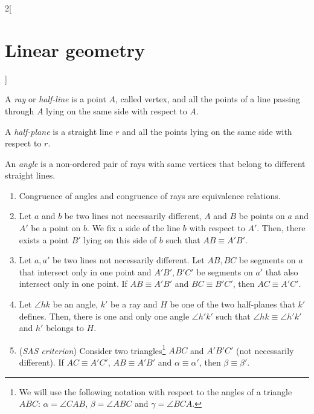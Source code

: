 \documentclass[../../../main_math.tex]{subfiles}
\begin{document}
\begin{multicols}{2}[\section{Linear geometry}]
\begin{axiom}
\begin{enumerate}
    \end{enumerate}
  \end{axiom}
  \begin{definition}
    A \emph{ray} or \emph{half-line} is a point $A$, called vertex, and all the points of a line passing through $A$ lying on the same side with respect to $A$.
  \end{definition}
  \begin{definition}
    A \emph{half-plane} is a straight line $r$ and all the points lying on the same side with respect to $r$.
  \end{definition}
  \begin{definition}
    An \emph{angle} is a non-ordered pair of rays with same vertices that belong to different straight lines.
  \end{definition}
  \begin{axiom}\label{LG_congruence}
    \hfill
    \begin{enumerate}
      \item Congruence of angles and congruence of rays are equivalence relations.
      \item Let $a$ and $b$ be two lines not necessarily different, $A$ and $B$ be points on $a$ and $A'$ be a point on $b$. We fix a side of the line $b$ with respect to $A'$. Then, there exists a point $B'$ lying on this side of $b$ such that $AB\equiv A'B'$.
      \item Let $a,a'$ be two lines not necessarily different. Let $AB,BC$ be segments on $a$ that intersect only in one point and $A'B',B'C'$ be segments on $a'$ that also intersect only in one point. If $AB\equiv A'B'$ and $BC\equiv B'C'$, then $AC\equiv A'C'$.
      \item Let $\angle hk$ be an angle, $k'$ be a ray and $H$ be one of the two half-planes that $k'$ defines. Then, there is one and only one angle $\angle h'k'$ such that $\angle hk\equiv\angle h'k'$ and $h'$ belongs to $H$.
      \item (\emph{SAS criterion}) Consider two triangles\footnote{We will use the following notation with respect to the angles of a triangle $ABC$: $\alpha=\angle CAB$, $\beta=\angle ABC$ and $\gamma=\angle BCA$.} $ABC$ and $A'B'C'$ (not necessarily different). If $AC\equiv A'C'$, $AB\equiv A'B'$ and $\alpha\equiv\alpha'$, then $\beta\equiv\beta'$.
    \end{enumerate}
  \end{axiom}
  \begin{axiom}

\end{axiom}
\end{multicols}
\end{document}
